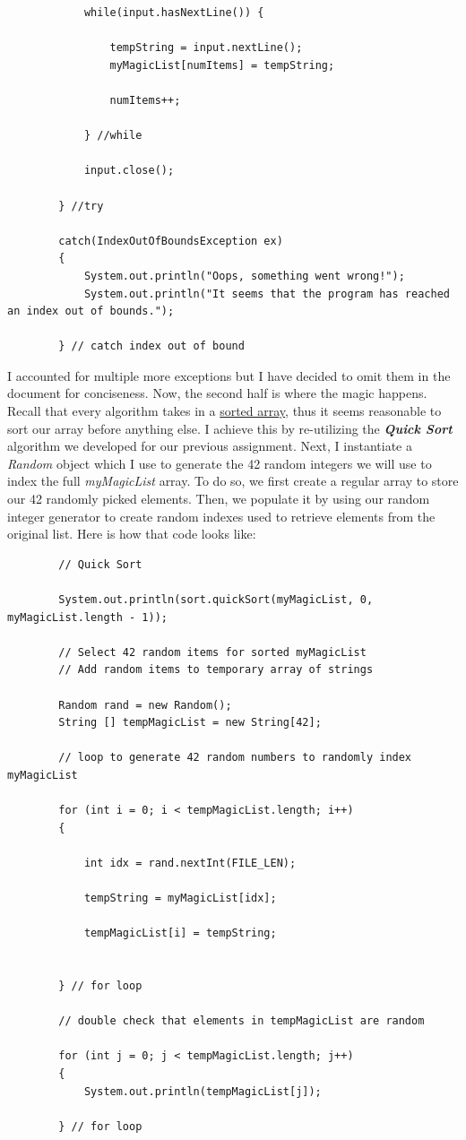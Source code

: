 \documentclass[letterpaper, 10pt]{article}
\begin{document}
\begin{lstlisting}
			while(input.hasNextLine()) {
				
				tempString = input.nextLine();
				myMagicList[numItems] = tempString;
				
				numItems++;
				
			} //while 
			
			input.close();
			
		} //try
		
		catch(IndexOutOfBoundsException ex)
	    {
			System.out.println("Oops, something went wrong!");
			System.out.println("It seems that the program has reached an index out of bounds.");
			
	    } // catch index out of bound
\end{lstlisting}
I accounted for multiple more exceptions but I have decided to omit them in the document for conciseness. Now, the second half is where the magic happens. Recall that every algorithm takes in a \underline{sorted array}, thus it seems reasonable to sort our array before anything else. I achieve this by re-utilizing the \textit{\textbf{Quick Sort}} algorithm we developed for our previous assignment. Next, I instantiate a \textit{Random} object which I use to generate the 42 random integers we will use to index the full \textit{myMagicList} array. To do so, we first create a regular array to store our 42 randomly picked elements. Then, we populate it by using our random integer generator to create random indexes used to retrieve elements from the original list. Here is how that code looks like:
\begin{lstlisting}
		// Quick Sort
		
		System.out.println(sort.quickSort(myMagicList, 0, myMagicList.length - 1));
		
		// Select 42 random items for sorted myMagicList
		// Add random items to temporary array of strings
		
		Random rand = new Random();
		String [] tempMagicList = new String[42];
		
		// loop to generate 42 random numbers to randomly index myMagicList
		
		for (int i = 0; i < tempMagicList.length; i++)
		{ 
			
			int idx = rand.nextInt(FILE_LEN);
			
			tempString = myMagicList[idx];
			
			tempMagicList[i] = tempString;
			
			
		} // for loop
		
		// double check that elements in tempMagicList are random
		
		for (int j = 0; j < tempMagicList.length; j++)
		{
			System.out.println(tempMagicList[j]);
			
		} // for loop
\end{lstlisting}
\end{document}

